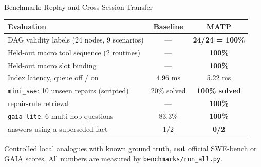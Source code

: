 \documentclass[aspectratio=169,10pt]{beamer}
\begin{document}
\begin{frame}{Benchmark: Replay and Cross-Session Transfer}
  \begin{table}
    \centering
    \footnotesize
    \begin{tabular}{lcc}
      \toprule
      Evaluation & Baseline & MATP\\
      \midrule
      DAG validity labels (24 nodes, 9 scenarios) & --- & \textbf{24/24 = 100\%}\\
      Held-out macro tool sequence (2 routines) & --- & \textbf{100\%}\\
      Held-out macro slot binding & --- & \textbf{100\%}\\
      Index latency, queue off / on & 4.96 ms & 5.22 ms\\
      \midrule
      \texttt{mini\_swe}: 10 unseen repairs (scripted) & 20\% solved & \textbf{100\% solved}\\
      \quad repair-rule retrieval & --- & \textbf{100\%}\\
      \texttt{gaia\_lite}: 6 multi-hop questions & 83.3\% & \textbf{100\%}\\
      \quad answers using a superseded fact & 1/2 & \textbf{0/2}\\
      \bottomrule
    \end{tabular}
  \end{table}
  \vspace{0.2em}
  {\scriptsize Controlled local analogues with known ground truth, \textbf{not} official SWE-bench or GAIA scores. All numbers are measured by \texttt{benchmarks/run\_all.py}.}
\end{frame}
\end{document}
